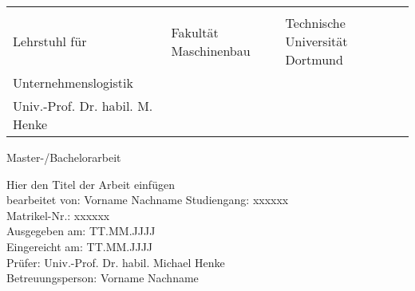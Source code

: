 \graphicspath{{./title_page/title_page_figures/}}

\begin{titlepage}
{
\par
{}
\hfill
{}
\hfill
{}
\par
\vspace{-30pt}

\small
\begin{tabularx}{\textwidth}{ XXX }
	\toprule
	\bigbreak \\
	Lehrstuhl für & Fakultät Maschinenbau & Technische Universität Dortmund \\
	Unternehmenslogistik & & \\
	Univ.-Prof. Dr. habil. M. Henke & & \\
\end{tabularx}
\vspace{4cm}

\begin{center}
\Huge
Master-/Bachelorarbeit \\
\vspace{3cm}
\Large

Hier den Titel der Arbeit einfügen\\

\vspace{6cm}
\large
bearbeitet von: Vorname Nachname
\bigbreak
\normalsize
Studiengang: xxxxxx\\
Matrikel-Nr.: xxxxxx\\
\bigbreak
Ausgegeben am: TT.MM.JJJJ\\
Eingereicht am: TT.MM.JJJJ\\
\bigbreak
Prüfer: Univ.-Prof. Dr. habil. Michael Henke\\
Betreuungsperson: Vorname Nachname
\end{center}



}
\end{titlepage}
\restoregeometry
\newpage

